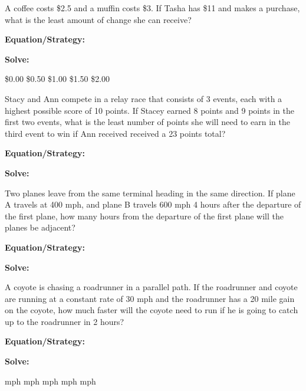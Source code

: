 \vfill
\newpage
\begin{multicols*}{2}
\begin{outline}[enumerate]
\medium

\1 A coffee costs \$2.5 and a muffin costs \$3. If Tasha has \$11 and makes a purchase, what is the least amount of change she can receive?

\bigskip
\textbf{Equation/Strategy:} \hrulefill

\bigskip
\textbf{Solve:}

\vfill
\2 \$0.00
\2 \$0.50
\2 \$1.00
\2 \$1.50
\2 \$2.00

\midline

\1 Stacy and Ann compete in a relay race that consists of 3 events, each with a highest possible score of 10 points. If Stacey earned 8 points and 9 points in the first two events, what is the least number of points she will need to earn in the third event to win if Ann received received a 23 points total?

\bigskip
\textbf{Equation/Strategy:} \hrulefill

\bigskip
\textbf{Solve:}

\vfill
{}

\columnbreak
\advanced

\1 Two planes leave from the same terminal heading in the same direction. If plane A travels at 400 mph, and plane B travels 600 mph 4 hours after the departure of the first plane, how many hours from the departure of the first plane will the planes be adjacent?

\bigskip
\textbf{Equation/Strategy:} \hrulefill

\bigskip
\textbf{Solve:}

\vfill
{}

\midline

\1 A coyote is chasing a roadrunner in a parallel path. If the roadrunner and coyote are running at a constant rate of 30 mph and the roadrunner has a 20 mile gain on the coyote, how much faster will the coyote need to run if he is going to catch up to the roadrunner in 2 hours?

\bigskip
\textbf{Equation/Strategy:} \hrulefill

\bigskip
\textbf{Solve:}

\vfill
{} mph
 mph
 mph
 mph
 mph
\end{outline}
\end{multicols*}
